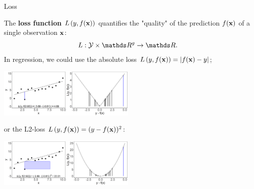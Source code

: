 \documentclass[11pt,compress,t,notes=noshow, xcolor=table]{beamer}
\begin{document}
\begin{vbframe}{Loss}

The \textbf{loss function} $L\left(y, f(\mathbf{x})\right)$ quantifies the "quality" of the prediction $f(\mathbf{x})$ of a single observation $\mathbf{x}$:
    $$
    L: \Yspace \times \R^g \to \R.
    $$
In regression, we could use the absolute loss $L\left(y, f(\mathbf{x})\right) = |f(\mathbf{x}) - y|$;





\begin{center}
\includegraphics[width=0.5\textwidth]{figure/ml-basic_riskmin-1-loss_abs.png}
\end{center}
or the L2-loss $L\left(y, f(\mathbf{x})\right) = (y - f(\mathbf{x}))^2$:
\begin{center}
\includegraphics[width=0.5\textwidth]{figure/ml-basic_riskmin-1-loss_sqrd.png}
\end{center}





\end{vbframe}
\end{document}
